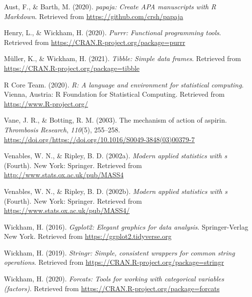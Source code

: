 \documentclass[
  english,
  man]{apa6}
\newlength{\cslhangindent}
\newenvironment{cslreferences}%
  {\setlength{\parindent}{0pt}%
  \everypar{\setlength{\hangindent}{\cslhangindent}}\ignorespaces}%
  {\par}
\begin{document}
\begingroup
\setlength{\parindent}{-0.5in}
\setlength{\leftskip}{0.5in}

\hypertarget{refs}{}
\begin{cslreferences}
\leavevmode\hypertarget{ref-R-papaja}{}%
Aust, F., \& Barth, M. (2020). \emph{papaja: Create APA manuscripts with R Markdown}. Retrieved from \url{https://github.com/crsh/papaja}

\leavevmode\hypertarget{ref-R-purrr}{}%
Henry, L., \& Wickham, H. (2020). \emph{Purrr: Functional programming tools}. Retrieved from \url{https://CRAN.R-project.org/package=purrr}

\leavevmode\hypertarget{ref-R-tibble}{}%
Müller, K., \& Wickham, H. (2021). \emph{Tibble: Simple data frames}. Retrieved from \url{https://CRAN.R-project.org/package=tibble}

\leavevmode\hypertarget{ref-R-base}{}%
R Core Team. (2020). \emph{R: A language and environment for statistical computing}. Vienna, Austria: R Foundation for Statistical Computing. Retrieved from \url{https://www.R-project.org/}

\leavevmode\hypertarget{ref-VANE2003255}{}%
Vane, J. R., \& Botting, R. M. (2003). The mechanism of action of aspirin. \emph{Thrombosis Research}, \emph{110}(5), 255--258. \url{https://doi.org/https://doi.org/10.1016/S0049-3848(03)00379-7}

\leavevmode\hypertarget{ref-R-MASS}{}%
Venables, W. N., \& Ripley, B. D. (2002a). \emph{Modern applied statistics with s} (Fourth). New York: Springer. Retrieved from \url{http://www.stats.ox.ac.uk/pub/MASS4}

\leavevmode\hypertarget{ref-R-nnet}{}%
Venables, W. N., \& Ripley, B. D. (2002b). \emph{Modern applied statistics with s} (Fourth). New York: Springer. Retrieved from \url{https://www.stats.ox.ac.uk/pub/MASS4/}

\leavevmode\hypertarget{ref-R-ggplot2}{}%
Wickham, H. (2016). \emph{Ggplot2: Elegant graphics for data analysis}. Springer-Verlag New York. Retrieved from \url{https://ggplot2.tidyverse.org}

\leavevmode\hypertarget{ref-R-stringr}{}%
Wickham, H. (2019). \emph{Stringr: Simple, consistent wrappers for common string operations}. Retrieved from \url{https://CRAN.R-project.org/package=stringr}

\leavevmode\hypertarget{ref-R-forcats}{}%
Wickham, H. (2020). \emph{Forcats: Tools for working with categorical variables (factors)}. Retrieved from \url{https://CRAN.R-project.org/package=forcats}


\end{cslreferences}
\end{document}
